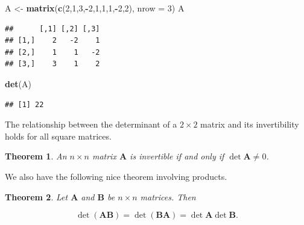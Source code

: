 \documentclass[
]{book}
\newenvironment{Shaded}{\begin{snugshade}}{\end{snugshade}}
\newcommand{\AttributeTok}[1]{\textcolor[rgb]{0.13,0.29,0.53}{#1}}
\newcommand{\DecValTok}[1]{\textcolor[rgb]{0.00,0.00,0.81}{#1}}
\newcommand{\FunctionTok}[1]{\textcolor[rgb]{0.13,0.29,0.53}{\textbf{#1}}}
\newcommand{\NormalTok}[1]{#1}
\newcommand{\OtherTok}[1]{\textcolor[rgb]{0.56,0.35,0.01}{#1}}
\newcommand{\SpecialCharTok}[1]{\textcolor[rgb]{0.81,0.36,0.00}{\textbf{#1}}}
\newtheorem{theorem}{Theorem}[chapter]
\theoremstyle{definition}
\theoremstyle{definition}
\theoremstyle{definition}
\theoremstyle{definition}
\theoremstyle{remark}
\begin{document}
\begin{Shaded}
\begin{Highlighting}[]
\NormalTok{A }\OtherTok{\textless{}{-}} \FunctionTok{matrix}\NormalTok{(}\FunctionTok{c}\NormalTok{(}\DecValTok{2}\NormalTok{,}\DecValTok{1}\NormalTok{,}\DecValTok{3}\NormalTok{,}\SpecialCharTok{{-}}\DecValTok{2}\NormalTok{,}\DecValTok{1}\NormalTok{,}\DecValTok{1}\NormalTok{,}\DecValTok{1}\NormalTok{,}\SpecialCharTok{{-}}\DecValTok{2}\NormalTok{,}\DecValTok{2}\NormalTok{), }\AttributeTok{nrow =} \DecValTok{3}\NormalTok{)}
\NormalTok{A}
\end{Highlighting}
\end{Shaded}

\begin{verbatim}
##      [,1] [,2] [,3]
## [1,]    2   -2    1
## [2,]    1    1   -2
## [3,]    3    1    2
\end{verbatim}

\begin{Shaded}
\begin{Highlighting}[]
\FunctionTok{det}\NormalTok{(A)}
\end{Highlighting}
\end{Shaded}

\begin{verbatim}
## [1] 22
\end{verbatim}

The relationship between the determinant of a \(2\times 2\) matrix and its invertibility holds for all square matrices.

\begin{theorembox}

\begin{theorem}
An \(n\times n\) matrix \(\mathbf{A}\) is invertible if and only if \(\det\mathbf{A}\neq 0\).
\end{theorem}

\end{theorembox}

We also have the following nice theorem involving products.

\begin{theorembox}

\begin{theorem}
\protect\hypertarget{thm:proddet}{}\label{thm:proddet}Let \(\mathbf{A}\) and \(\mathbf{B}\) be \(n\times n\) matrices. Then

\[\det(\mathbf{A}\mathbf{B})=\det(\mathbf{B}\mathbf{A})=\det\mathbf{A}\det \mathbf{B}.\]
\end{theorem}

\end{theorembox}
\end{document}
